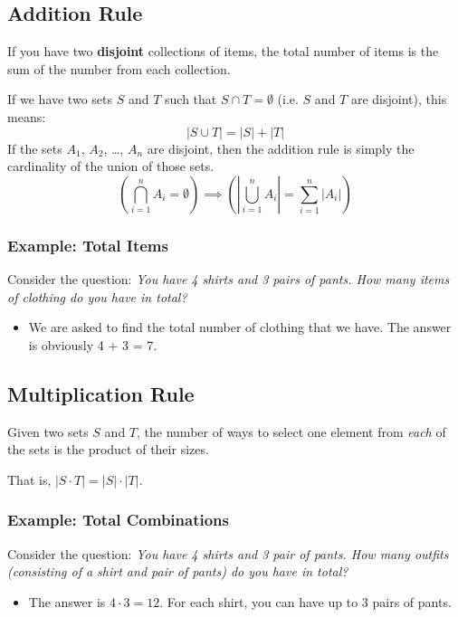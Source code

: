 \documentclass[letterpaper]{article}
\begin{document}
\subsection{Addition Rule}
If you have two \textbf{disjoint} collections of items, the total number of items is the sum of the number from each collection.

\bigskip 

If we have two sets $S$ and $T$ such that $S \cap T = \emptyset$ (i.e. $S$ and $T$ are disjoint), this means:
\[|S \cup T| = |S| + |T|\]
If the sets $A_1$, $A_2$, \dots, $A_n$ are disjoint, then the addition rule is simply the cardinality of the union of those sets. 
\[\left(\bigcap_{i = 1}^n A_i = \emptyset\right) \implies \left(\left| \bigcup_{i = 1}^n A_i \right| = \sum_{i = 1}^n |A_i|\right)\]

\subsubsection{Example: Total Items}
Consider the question: \emph{You have 4 shirts and 3 pairs of pants. How many items of clothing do you have in total?} 
\begin{itemize}
    \item We are asked to find the total number of clothing that we have. The answer is obviously 4 + 3 = 7.
\end{itemize}

\subsection{Multiplication Rule}
Given two sets $S$ and $T$, the number of ways to select one element from \emph{each} of the sets is the product of their sizes.

\bigskip 

That is, $|S \cdot T| = |S| \cdot |T|$.

\subsubsection{Example: Total Combinations}
Consider the question: \emph{You have 4 shirts and 3 pair of pants. How many outfits (consisting of a shirt and pair of pants) do you have in total?} 

\begin{itemize}
    \item The answer is $4 \cdot 3 = 12$. For each shirt, you can have up to 3 pairs of pants. 
\end{itemize}
\end{document}
